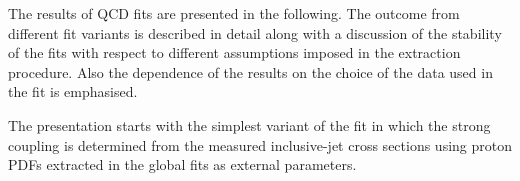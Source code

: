 The results of QCD fits are presented in the following. The outcome from different fit variants is described in detail along with a discussion of the stability of the fits with respect to different assumptions imposed in the \asz extraction procedure. Also the dependence of the results on the choice of the data used in the fit is emphasised.

The presentation starts with the simplest variant of the fit in which the strong coupling \asz is determined from the measured inclusive-jet cross sections using proton PDFs extracted in the global fits as external parameters.